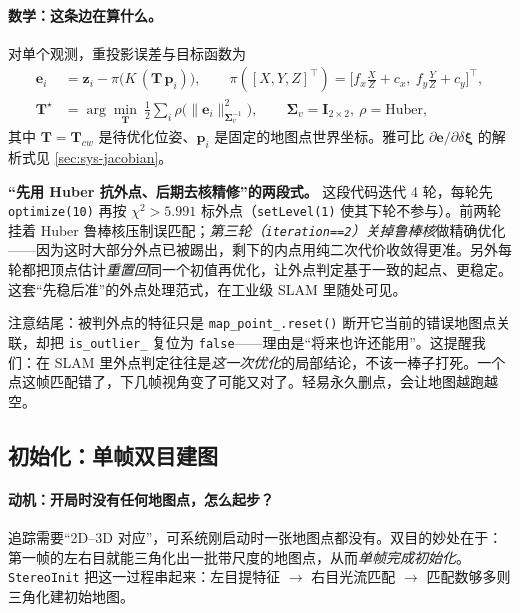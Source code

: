 \paragraph{数学：这条边在算什么。}
对单个观测，重投影误差与目标函数为
\begin{align}
  \mathbf{e}_i &= \mathbf{z}_i-\pi\!\big(K\,(\mathbf{T}\,\mathbf{p}_i)\big),\qquad
  \pi([X,Y,Z]^\top)=\Big[f_x\tfrac{X}{Z}+c_x,\ f_y\tfrac{Y}{Z}+c_y\Big]^\top,
  \label{eq:sys-reproj}\\
  \mathbf{T}^\star &= \arg\min_{\mathbf{T}}\ \tfrac12\sum_i \rho\!\Big(\big\|\mathbf{e}_i\big\|^2_{\boldsymbol\Sigma_v^{-1}}\Big),
  \qquad \boldsymbol\Sigma_v=\mathbf{I}_{2\times2},\ \rho=\text{Huber},
  \label{eq:sys-poseonly}
\end{align}
其中 $\mathbf{T}=\mathbf{T}_{cw}$ 是待优化位姿、$\mathbf{p}_i$ 是固定的地图点世界坐标。雅可比 $\partial\mathbf{e}/\partial\delta\boldsymbol\xi$ 的解析式见 \cref{sec:sys-jacobian}。

\begin{insight}
\textbf{“先用 Huber 抗外点、后期去核精修”的两段式。}
这段代码迭代 4 轮，每轮先 \texttt{optimize(10)} 再按 $\chi^2>5.991$ 标外点（\verb|setLevel(1)| 使其下轮不参与）。前两轮挂着 Huber 鲁棒核压制误匹配；\emph{第三轮（\texttt{iteration==2}）关掉鲁棒核}做精确优化——因为这时大部分外点已被踢出，剩下的内点用纯二次代价收敛得更准。另外每轮都把顶点估计\emph{重置回}同一个初值再优化，让外点判定基于一致的起点、更稳定。这套“先稳后准”的外点处理范式，在工业级 SLAM 里随处可见。
\end{insight}

\begin{pitfall}
注意结尾：被判外点的特征只是 \verb|map_point_.reset()| 断开它当前的错误地图点关联，却把 \texttt{is\_outlier\_} 复位为 \texttt{false}——理由是“将来也许还能用”。这提醒我们：在 SLAM 里外点判定往往是\emph{这一次优化}的局部结论，不该一棒子打死。一个点这帧匹配错了，下几帧视角变了可能又对了。轻易永久删点，会让地图越跑越空。
\end{pitfall}

\subsection{初始化：单帧双目建图}
\label{sec:sys-init}

\paragraph{动机：开局时没有任何地图点，怎么起步？}
追踪需要“2D--3D 对应”，可系统刚启动时一张地图点都没有。双目的妙处在于：第一帧的左右目就能三角化出一批带尺度的地图点，从而\emph{单帧完成初始化}。\texttt{StereoInit} 把这一过程串起来：左目提特征 $\to$ 右目光流匹配 $\to$ 匹配数够多则三角化建初始地图。


